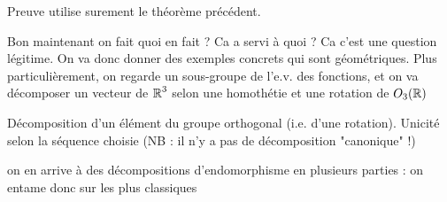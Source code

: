 \begin{definition}
\end{definition}

\begin{theorem}
\end{theorem}


\begin{theorem}
	Preuve utilise surement le théorème précédent.
\end{theorem}

\begin{remark}
	Bon maintenant on fait quoi en fait ?
	Ca a servi à quoi ? Ca c'est une question légitime.
	On va donc donner des exemples concrets qui sont géométriques.
	Plus particulièrement, on regarde un sous-groupe de l'e.v. des fonctions,
	et on va décomposer un vecteur de $\operatorname{\mathbb{R}}^3$ selon une homothétie et une rotation de $O_3(\operatorname{\mathbb{R}})$
\end{remark}


\begin{definition}[Diagonalisation]
\end{definition}

\begin{definition}[Trigonalisation]
\end{definition}

\begin{definition}
\end{definition}

\begin{definition}[Homothétie]
\end{definition}

\begin{proposition}
	Décomposition d'un élément du groupe orthogonal (i.e. d'une rotation).
	Unicité selon la séquence choisie (NB : il n'y a pas de décomposition "canonique" !)
\end{proposition}

\begin{remark}
	on en arrive à des décompositions d'endomorphisme en plusieurs parties : on entame donc sur les plus classiques
\end{remark}

\begin{theorem}
\end{theorem}

\begin{definition}
\end{definition}

